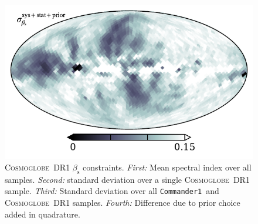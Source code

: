 \documentclass[twocolumn]{../../common/aa}
\def\commanderone{\texttt{Commander1}}
\newcommand{\cosmoglobe}{\textsc{Cosmoglobe}}
\begin{document}
\begin{figure}
	\includegraphics[width=\columnwidth]{figures/beta_n0016_sd_stat_inst_prior.pdf}
	\caption{
		\cosmoglobe\ DR1 $\beta_\mathrm s$ constraints. \textit{First:} Mean spectral index over all samples. \textit{Second:} standard deviation over a single \cosmoglobe\ DR1 sample. \textit{Third:} Standard deviation over all \commanderone\ and \cosmoglobe\ DR1 samples. \textit{Fourth:} Difference due to prior choice added in quadrature.}
	\label{fig:beta_16}
\end{figure}
\end{document}

